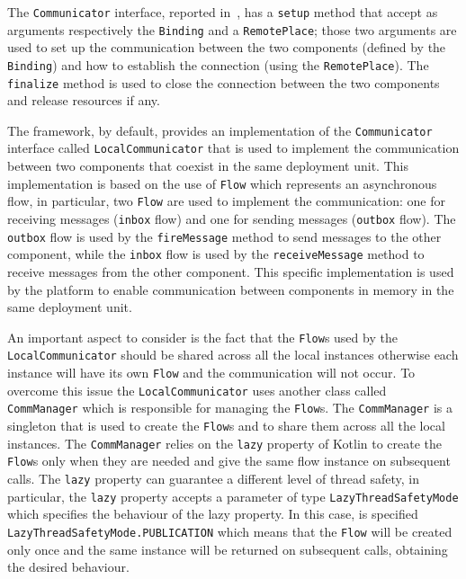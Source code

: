 The \texttt{Communicator} interface, reported in~, has a \texttt{setup} method that accept as arguments respectively
the \texttt{Binding} and a \texttt{RemotePlace};
those two arguments are used to set up the communication between the two components (defined by the \texttt{Binding}) and how to establish
the connection (using the \texttt{RemotePlace}). The \texttt{finalize} method is used to close the connection between the two components and release
resources if any.



The framework, by default, provides an implementation of the \texttt{Communicator} interface called \texttt{LocalCommunicator} that is used to
implement the communication between two components that coexist in the same deployment unit. This implementation is based on the use of
\texttt{Flow} which represents an asynchronous flow, in particular, two \texttt{Flow} are used to implement the communication: one for receiving
messages (\texttt{inbox} flow) and one for sending messages (\texttt{outbox} flow).
The \texttt{outbox} flow is used by the \texttt{fireMessage} method to send messages to the other component, while the \texttt{inbox} flow is used
by the \texttt{receiveMessage} method to receive messages from the other component.
This specific implementation is used by the platform to enable communication between components in memory in the same deployment unit.

An important aspect to consider is the fact that the \texttt{Flow}s used by the \texttt{LocalCommunicator} should be shared across all the local instances otherwise each instance will have its own \texttt{Flow} and the communication will not occur. To overcome this issue the
\texttt{LocalCommunicator} uses another class called \texttt{CommManager} which is responsible for managing the \texttt{Flow}s.
The \texttt{CommManager} is a singleton that is used to create the \texttt{Flow}s and to share them across all the local instances.
The \texttt{CommManager} relies on the \texttt{lazy} property of Kotlin to create the \texttt{Flow}s only when they are needed and give the same flow
instance on subsequent calls. The \texttt{lazy} property can guarantee a different level of thread safety, in particular, the \texttt{lazy} property
accepts a parameter of type \texttt{LazyThreadSafetyMode} which specifies the behaviour of the lazy property. In this case, is specified
\texttt{LazyThreadSafetyMode.PUBLICATION} which means that the \texttt{Flow} will be created only once and the same instance will be returned on
subsequent calls, obtaining the desired behaviour.

